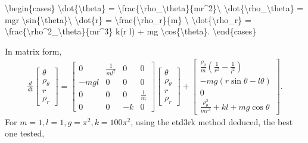 \documentclass[letterpaper,10pt,english]{jupyterBook}
\begin{document}
\sphinxAtStartPar
\textbackslash{}begin\{cases\}
\textbackslash{}dot\{\textbackslash{}theta\} = \textbackslash{}frac\{\textbackslash{}rho\_\textbackslash{}theta\}\{mr\textasciicircum{}2\}\textbackslash{}
\textbackslash{}dot\{\textbackslash{}rho\_\textbackslash{}theta\} = \sphinxhyphen{}mgr \textbackslash{}sin\{\textbackslash{}theta\}\textbackslash{}
\textbackslash{}dot\{r\} = \textbackslash{}frac\{\textbackslash{}rho\_r\}\{m\} \textbackslash{}
\textbackslash{}dot\{\textbackslash{}rho\_r\} = \textbackslash{}frac\{\textbackslash{}rho\textasciicircum{}2\_\textbackslash{}theta\}\{mr\textasciicircum{}3\} \sphinxhyphen{} k(r \sphinxhyphen{} l) + mg \textbackslash{}cos\{\textbackslash{}theta\}.
\textbackslash{}end\{cases\}

\sphinxAtStartPar
In matrix form,
\begin{equation*}
\begin{split}
  \frac{d}{dt}\begin{bmatrix}
              \theta\\
              \rho_\theta\\
              r\\
              \rho_r
              \end{bmatrix}
  =
  \begin{bmatrix}
  0 & \frac{1}{ml^2} & 0 & 0\\
  -mgl & 0 & 0 & 0\\
  0 & 0 & 0 & \frac{1}{m}\\
  0 & 0 & -k & 0
  \end{bmatrix}
  \begin{bmatrix}
  \theta\\
  \rho_\theta\\
  r\\
  \rho_r
  \end{bmatrix}
  +
  \begin{bmatrix}
  \frac{\rho_\theta}{m} \left(\frac{1}{r^2}-\frac{1}{l^2}\right)\\
  -mg(r\sin{\theta}-l\theta)\\
  0\\
  \frac{\rho^2_\theta}{mr^3} + kl + mg \cos{\theta}
  \end{bmatrix}.
\end{split}
\end{equation*}
\sphinxAtStartPar
For \(m = 1, l = 1, g = \pi^2, k = 100 \pi^2\), using the etd3rk method deduced, the best one tested,
\end{document}
